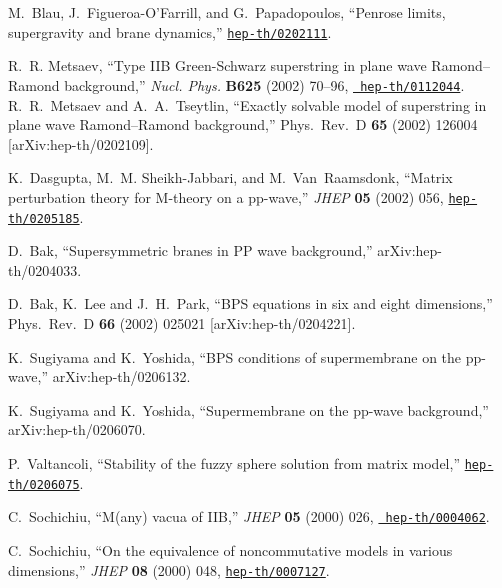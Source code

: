 \documentclass[a4paper]{article}
\begin{document}
\begin{thebibliography}{10}
M.~Blau, J.~Figueroa-O'Farrill, and G.~Papadopoulos, ``Penrose limits,
  supergravity and brane dynamics,''
\href{http://arXiv.org/abs/hep-th/0202111}{{\tt hep-th/0202111}}.

R.~R. Metsaev, ``Type IIB Green-Schwarz superstring in plane wave
Ramond--Ramond background,'' {\em Nucl. Phys.} {\bf B625} (2002)
70--96, \href{http://arXiv.org/abs/hep-th/0112044}{{\tt
hep-th/0112044}}.
R.~R.~Metsaev and A.~A.~Tseytlin, ``Exactly solvable model of
superstring in plane wave Ramond--Ramond  background,'' Phys.\
Rev.\ D {\bf 65} (2002) 126004 [arXiv:hep-th/0202109].


K.~Dasgupta, M.~M. Sheikh-Jabbari, and M.~Van~Raamsdonk, ``Matrix perturbation
  theory for M-theory on a pp-wave,'' {\em JHEP} {\bf 05} (2002) 056,
\href{http://arXiv.org/abs/hep-th/0205185}{{\tt hep-th/0205185}}.

D.~Bak, ``Supersymmetric branes in PP wave background,''
arXiv:hep-th/0204033.

D.~Bak, K.~Lee and J.~H.~Park, ``BPS equations in six and eight
dimensions,'' Phys.\ Rev.\ D {\bf 66} (2002) 025021
[arXiv:hep-th/0204221].

K.~Sugiyama and K.~Yoshida,
``BPS conditions of supermembrane on the pp-wave,''
arXiv:hep-th/0206132.

K.~Sugiyama and K.~Yoshida,
``Supermembrane on the pp-wave background,''
arXiv:hep-th/0206070.

P.~Valtancoli, ``Stability of the fuzzy sphere solution from matrix model,''
\href{http://arXiv.org/abs/hep-th/0206075}{{\tt hep-th/0206075}}.

C.~Sochichiu, ``M(any) vacua of IIB,'' {\em JHEP} {\bf 05} (2000)
026, \href{http://arXiv.org/abs/hep-th/0004062}{{\tt
hep-th/0004062}}.

C.~Sochichiu, ``On the equivalence of noncommutative models in various
  dimensions,'' {\em JHEP} {\bf 08} (2000) 048,
\href{http://arXiv.org/abs/hep-th/0007127}{{\tt hep-th/0007127}}.


\end{thebibliography}
\end{document}
